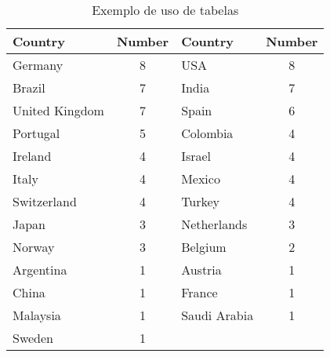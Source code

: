 \begin{table}[!ht]

%

\setlength{\arrayrulewidth}{2\arrayrulewidth}  %
\setlength{\tabcolsep}{4pt} %
\centering

\caption{Exemplo de uso de tabelas}
\label{tablePaises}

\selectfont
	\begin{tabular}{lclc}
		\toprule
		Country           & Number & Country         & Number \\ \midrule
		Germany        & 8          & USA          & 8          \\
		Brazil         & 7          & India        & 7          \\
		United Kingdom & 7          & Spain        & 6          \\
		Portugal       & 5          & Colombia     & 4          \\
		Ireland        & 4          & Israel       & 4          \\
		Italy          & 4          & Mexico       & 4          \\
		Switzerland    & 4          & Turkey       & 4          \\
		Japan          & 3          & Netherlands  & 3          \\
		Norway         & 3          & Belgium      & 2          \\
		Argentina      & 1          & Austria      & 1          \\
		China          & 1          & France       & 1          \\
		Malaysia       & 1          & Saudi Arabia & 1          \\
		Sweden         & 1          &              &            \\ \bottomrule
	\end{tabular}
\end{table}


